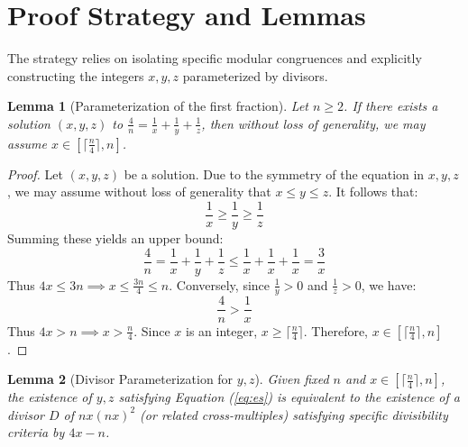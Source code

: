 \documentclass[12pt,a4paper]{article}
\newtheorem{lemma}{Lemma}
\begin{document}
\section{Proof Strategy and Lemmas}

The strategy relies on isolating specific modular congruences and explicitly constructing the integers $x,y,z$ parameterized by divisors.

\begin{lemma}[Parameterization of the first fraction]
\label{lem:param}
Let $n \geq 2$. If there exists a solution $(x,y,z)$ to $\frac{4}{n} = \frac{1}{x} + \frac{1}{y} + \frac{1}{z}$, then without loss of generality, we may assume $x \in [\lceil \frac{n}{4} \rceil, n]$.
\end{lemma}

\begin{proof}
Let $(x,y,z)$ be a solution. Due to the symmetry of the equation in $x, y, z$, we may assume without loss of generality that $x \leq y \leq z$.
It follows that:
\begin{equation}
\frac{1}{x} \geq \frac{1}{y} \geq \frac{1}{z}
\end{equation}
Summing these yields an upper bound:
\begin{equation}
\frac{4}{n} = \frac{1}{x} + \frac{1}{y} + \frac{1}{z} \leq \frac{1}{x} + \frac{1}{x} + \frac{1}{x} = \frac{3}{x}
\end{equation}
Thus $4x \leq 3n \implies x \leq \frac{3n}{4} \leq n$.
Conversely, since $\frac{1}{y} > 0$ and $\frac{1}{z} > 0$, we have:
\begin{equation}
\frac{4}{n} > \frac{1}{x}
\end{equation}
Thus $4x > n \implies x > \frac{n}{4}$. Since $x$ is an integer, $x \geq \lceil \frac{n}{4} \rceil$.
Therefore, $x \in [\lceil \frac{n}{4} \rceil, n]$.
\end{proof}

\begin{lemma}[Divisor Parameterization for $y, z$]
\label{lem:div}
Given fixed $n$ and $x \in [\lceil \frac{n}{4} \rceil, n]$, the existence of $y, z$ satisfying Equation (\ref{eq:es}) is equivalent to the existence of a divisor $D$ of $nx(nx)^2$ (or related cross-multiples) satisfying specific divisibility criteria by $4x - n$.
\end{lemma}
\end{document}
